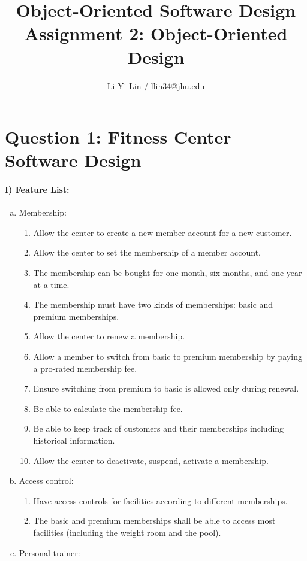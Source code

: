 \documentclass[11pt]{article}
\title{Object-Oriented Software Design\\Assignment 2: Object-Oriented Design}
\author{Li-Yi Lin / llin34@jhu.edu}
\date{}
\begin{document}
\large
\maketitle
\thispagestyle{headings}

\section{Question 1: Fitness Center Software Design}
\paragraph{I) Feature List:}
\begin{enumerate}[(a)]
\item Membership:
\begin{enumerate}[(1)]
\item Allow the center to create a new member account for a new customer.
\item Allow the center to set the membership of a member account.
\item The membership can be bought for one month, six months, and one year at a time.
\item The membership must have two kinds of memberships: basic and premium memberships.
\item Allow the center to renew a membership.
\item Allow a member to switch from basic to premium membership by paying a pro-rated membership fee.
\item Ensure switching from premium to basic is allowed only during renewal.
\item Be able to calculate the membership fee.
\item Be able to keep track of customers and their memberships including historical information.
\item Allow the center to deactivate, suspend, activate a membership.
\end{enumerate}
\item Access control:
\begin{enumerate}[(1)]
\item Have access controls for facilities according to different memberships. 
\item The basic and premium memberships shall be able to access most facilities (including the weight room and the pool).
\end{enumerate}
\item Personal trainer:
\begin{enumerate}[(1)]

\end{enumerate}
\end{enumerate}
\end{document}
